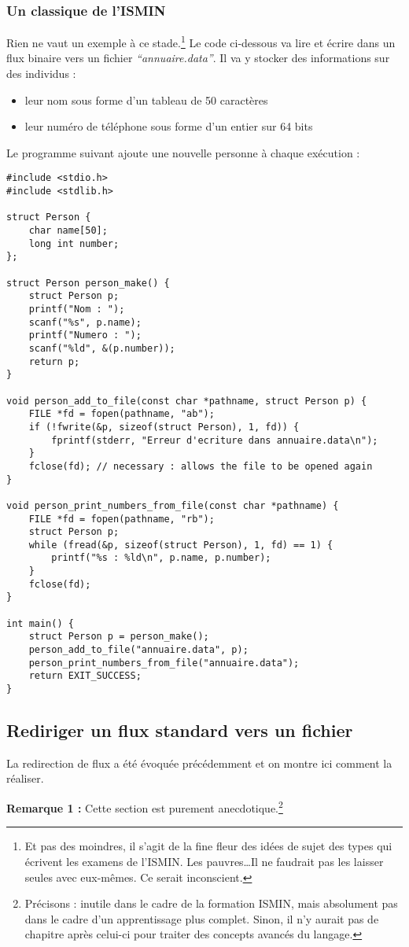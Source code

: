 \documentclass[../../../main.tex]{subfiles}
\begin{document}
\subsubsection{Un classique de l'ISMIN}
Rien ne vaut un exemple à ce stade.\footnote{Et pas des moindres, il s'agit de la fine fleur des idées de sujet des types qui écrivent les examens de l'ISMIN. Les pauvres\dots Il ne faudrait pas les laisser seules avec eux-mêmes. Ce serait inconscient.} Le code ci-dessous va lire et écrire dans un flux binaire vers un fichier \textit{``annuaire.data''}. Il va y stocker des informations sur des individus :
\begin{itemize}
	\item leur nom sous forme d'un tableau de 50 caractères
	\item leur numéro de téléphone sous forme d'un entier sur 64 bits
\end{itemize}
Le programme suivant ajoute une nouvelle personne à chaque exécution :
\begin{verbatim}
#include <stdio.h>
#include <stdlib.h>

struct Person {
	char name[50];
	long int number;
};

struct Person person_make() {
	struct Person p;
	printf("Nom : ");
	scanf("%s", p.name);
	printf("Numero : ");
	scanf("%ld", &(p.number));
	return p;
}

void person_add_to_file(const char *pathname, struct Person p) {
	FILE *fd = fopen(pathname, "ab");
	if (!fwrite(&p, sizeof(struct Person), 1, fd)) {
		fprintf(stderr, "Erreur d'ecriture dans annuaire.data\n");
	}
	fclose(fd); // necessary : allows the file to be opened again
}

void person_print_numbers_from_file(const char *pathname) {
	FILE *fd = fopen(pathname, "rb");
	struct Person p;
	while (fread(&p, sizeof(struct Person), 1, fd) == 1) {
		printf("%s : %ld\n", p.name, p.number);
	}
	fclose(fd);
}

int main() {
	struct Person p = person_make();
	person_add_to_file("annuaire.data", p);
	person_print_numbers_from_file("annuaire.data");
	return EXIT_SUCCESS;
}
\end{verbatim}
\subsection{Rediriger un flux standard vers un fichier}
La redirection de flux a été évoquée précédemment et on montre ici comment la réaliser.
 
\textbf{Remarque 1 :} Cette section est purement anecdotique.\footnote{Précisons : inutile dans le cadre de la formation ISMIN, mais absolument pas dans le cadre d'un apprentissage plus complet. Sinon, il n'y aurait pas de chapitre après celui-ci pour traiter des concepts avancés du langage.}
 
\end{document}
